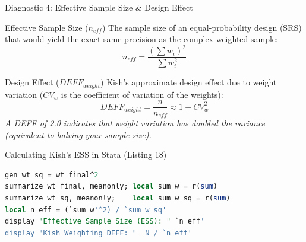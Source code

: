 \documentclass[10pt, aspectratio=169]{beamer}
\begin{document}
\begin{frame}[fragile]{Diagnostic 4: Effective Sample Size \& Design Effect}
  \begin{block}{Effective Sample Size ($n_{eff}$)}
    The sample size of an equal-probability design (SRS) that would yield the exact same precision as the complex weighted sample:
    \begin{equation}
      n_{eff} = \frac{(\sum w_{i})^{2}}{\sum w_{i}^{2}}
    \end{equation}
  \end{block}
  \begin{block}{Design Effect ($DEFF_{weight}$)}
    Kish's approximate design effect due to weight variation ($CV_w$ is the coefficient of variation of the weights):
    \begin{equation}
      DEFF_{weight} = \frac{n}{n_{eff}} \approx 1 + CV_{w}^{2}
    \end{equation}
    \textit{A DEFF of 2.0 indicates that weight variation has doubled the variance (equivalent to halving your sample size).}
  \end{block}

  \begin{block}{Calculating Kish's ESS in Stata (Listing 18)}
\begin{lstlisting}[language=SQL]
gen wt_sq = wt_final^2
summarize wt_final, meanonly; local sum_w = r(sum)
summarize wt_sq, meanonly;    local sum_w_sq = r(sum)
local n_eff = (`sum_w'^2) / `sum_w_sq'
display "Effective Sample Size (ESS): " `n_eff'
display "Kish Weighting DEFF: " _N / `n_eff'
\end{lstlisting}
  \end{block}
\end{frame}
\end{document}
